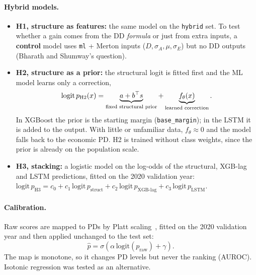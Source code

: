 \paragraph{Hybrid models.}
\begin{itemize}
  \item \textbf{H1, structure as features:} the same model on the \texttt{hybrid} set. To test whether a gain
        comes from the DD \emph{formula} or just from extra inputs, a \textbf{control} model uses
        \texttt{ml} + Merton inputs ($D,\sigma_A,\mu,\sigma_E$) but no DD outputs (Bharath and Shumway's question).
  \item \textbf{H2, structure as a prior:} the structural logit is fitted first and the ML model learns only a correction,
        \begin{equation}
          \mathrm{logit}\, p_{\mathrm{H2}}(x) = \underbrace{a + b^\top s}_{\mbox{\scriptsize fixed structural prior}} + \underbrace{f_\theta(x)}_{\mbox{\scriptsize learned correction}}.
          \label{eq:h2}
        \end{equation}
        In XGBoost the prior is the starting margin (\texttt{base\_margin}); in the LSTM it is added to the output.
        With little or unfamiliar data, $f_\theta\approx 0$ and the model falls back to the economic PD. H2 is
        trained without class weights, since the prior is already on the population scale.
  \item \textbf{H3, stacking:} a logistic model on the log-odds of the structural, XGB-lag and LSTM predictions,
        fitted on the 2020 validation year:
        $\mathrm{logit}\, p_{\mathrm{H3}} = c_0 + c_1\,\mathrm{logit}\, p_{\mathrm{struct}} + c_2\,\mathrm{logit}\, p_{\mathrm{XGB\mbox{-}lag}} + c_3\,\mathrm{logit}\, p_{\mathrm{LSTM}}$.
\end{itemize}

\paragraph{Calibration.} Raw scores are mapped to PDs by Platt scaling~\cite{platt1999}, fitted on the 2020
validation year and then applied unchanged to the test set:
\begin{equation}
  \hat p = \sigma\left(\alpha\,\mathrm{logit}(p_{\mathrm{raw}}) + \gamma\right).
  \label{eq:platt}
\end{equation}
The map is monotone, so it changes PD levels but never the ranking (AUROC). Isotonic regression was tested as an alternative.

